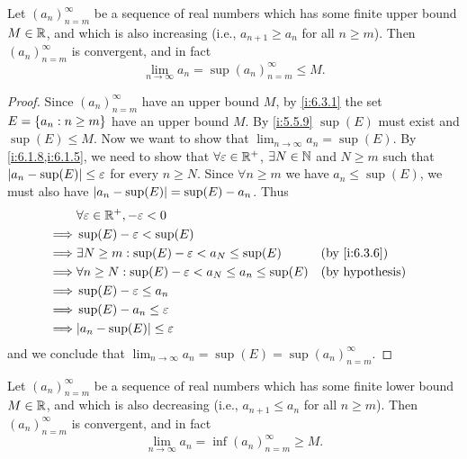 \begin{prop}\label{i:6.3.8}
  Let \((a_n)_{n = m}^\infty\) be a sequence of real numbers which has some finite upper bound \(M \in \mathbb{R}\), and which is also increasing (i.e., \(a_{n + 1} \geq a_n\) for all \(n \geq m\)).
  Then \((a_n)_{n = m}^\infty\) is convergent, and in fact
  \[
    \lim_{n \to \infty} a_n = \sup(a_n)_{n = m}^\infty \leq M.
  \]
\end{prop}

\begin{proof}
  Since \((a_n)_{n = m}^\infty\) have an upper bound \(M\), by \cref{i:6.3.1} the set \(E = \left\lbrace a_n : n \geq m\right\rbrace\) have an upper bound \(M\).
  By \cref{i:5.5.9} \(\sup(E)\) must exist and \(\sup(E) \leq M\).
  Now we want to show that \(\lim_{n \to \infty} a_n = \sup(E)\).
  By \cref{i:6.1.8,i:6.1.5}, we need to show that \(\forall \varepsilon \in \mathbb{R}^+\), \(\exists N \in \mathbb{N}\) and \(N \geq m\) such that \(\left\lvert a_n - \sup(E)\right\rvert \leq \varepsilon\) for every \(n \geq N\).
  Since \(\forall n \geq m\) we have \(a_n \leq \sup(E)\), we must also have \(\left\lvert a_n - \sup(E)\right\rvert = \sup(E) - a_n\).
  Thus
  \begin{align*}
             & \forall \varepsilon \in \R^+, -\varepsilon < 0                                                   \\
    \implies & \sup(E) - \varepsilon < \sup(E)                                                                  \\
    \implies & \exists N \geq m : \sup(E) - \varepsilon < a_N \leq \sup(E)          &  & \by{i:6.3.6}           \\
    \implies & \forall n \geq N : \sup(E) - \varepsilon < a_N \leq a_n \leq \sup(E) &  & \text{(by hypothesis)} \\
    \implies & \sup(E) - \varepsilon \leq a_n                                                                   \\
    \implies & \sup(E) - a_n \leq \varepsilon                                                                   \\
    \implies & \abs{a_n - \sup(E)} \leq \varepsilon
  \end{align*}
  and we conclude that \(\lim_{n \to \infty} a_n = \sup(E) = \sup(a_n)_{n = m}^\infty\).
\end{proof}

\begin{ac}\label{i:ac:6.3.1}
  Let \((a_n)_{n = m}^\infty\) be a sequence of real numbers which has some finite lower bound \(M \in \mathbb{R}\), and which is also decreasing (i.e., \(a_{n + 1} \leq a_n\) for all \(n \geq m\)).
  Then \((a_n)_{n = m}^\infty\) is convergent, and in fact
  \[
    \lim_{n \to \infty} a_n = \inf(a_n)_{n = m}^\infty \geq M.
  \]
\end{ac}

